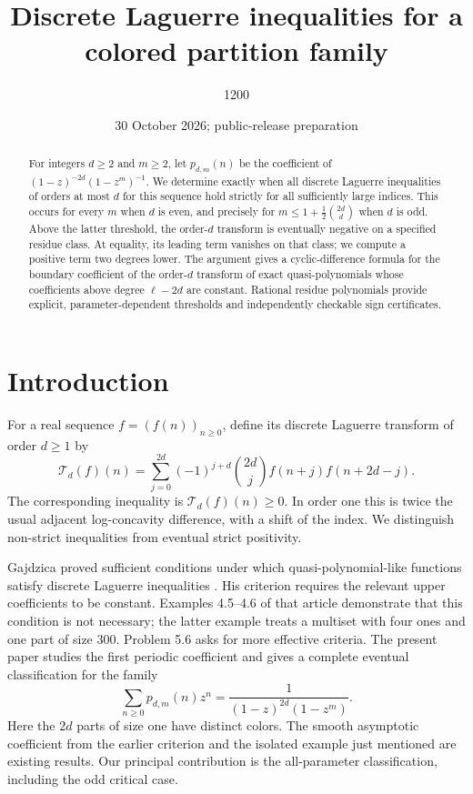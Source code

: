 \documentclass[11pt,reqno]{amsart}
\title{Discrete Laguerre inequalities for a colored partition family}
\author{1200}
\date{30 October 2026; public-release preparation}
\theoremstyle{remark}
\newcommand{\Lag}{\mathcal{T}}
\begin{document}
\begin{abstract}
For integers \(d\ge2\) and \(m\ge2\), let \(p_{d,m}(n)\) be the coefficient of
\((1-z)^{-2d}(1-z^m)^{-1}\). We determine exactly when all discrete Laguerre
inequalities of orders at most \(d\) for this sequence hold strictly for all
sufficiently large indices. This occurs for every \(m\) when \(d\) is even,
and precisely for \(m\le 1+\frac12\binom{2d}{d}\) when \(d\) is odd.
Above the latter threshold, the order-\(d\) transform is eventually negative
on a specified residue class. At equality, its leading term vanishes on that
class; we compute a positive term two degrees lower. The argument gives a
cyclic-difference formula for the boundary coefficient of the order-\(d\)
transform of exact quasi-polynomials whose coefficients above degree
\(\ell-2d\) are constant. Rational residue polynomials provide explicit,
parameter-dependent thresholds and independently checkable sign certificates.
\end{abstract}
\maketitle

\section{Introduction}

For a real sequence \(f=(f(n))_{n\ge0}\), define its discrete Laguerre transform
of order \(d\ge1\) by
\begin{equation}\label{eq:lag}
 \Lag_d(f)(n)=
 \sum_{j=0}^{2d}(-1)^{j+d}\binom{2d}{j}f(n+j)f(n+2d-j).
\end{equation}
The corresponding inequality is \(\Lag_d(f)(n)\ge0\). In order one this is
twice the usual adjacent log-concavity difference, with a shift of the index.
We distinguish non-strict inequalities from eventual strict positivity.

Gajdzica proved sufficient conditions under which quasi-polynomial-like
functions satisfy discrete Laguerre inequalities
\cite[Theorems 4.3--4.4]{Gajdzica_2024}.
His criterion requires the relevant upper coefficients to be constant.
Examples 4.5--4.6 of that article demonstrate that this condition is not
necessary; the latter example treats a multiset with four ones and one part
of size \(300\). Problem 5.6 asks for more effective criteria.
The present paper studies the first periodic coefficient and gives a complete
eventual classification for the family
\begin{equation}\label{eq:gf}
 \sum_{n\ge0}p_{d,m}(n)z^n=\frac{1}{(1-z)^{2d}(1-z^m)}.
\end{equation}
Here the \(2d\) parts of size one have distinct colors. The smooth asymptotic
coefficient from the earlier criterion and the isolated example just
mentioned are existing results. Our principal contribution is the
all-parameter classification, including the odd critical case.
\end{document}
